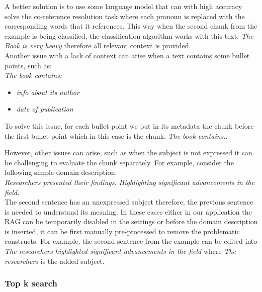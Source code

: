 A better solution is to use some language model that can with high accuracy solve the co-reference resolution task where each pronoun is replaced with the corresponding words that it references. This way when the second chunk from the example is being classified, the classification algorithm works with this text: \textit{The Book is very heavy} therefore all relevant context is provided. \\

Another issue with a lack of context can arise when a text contains some bullet points, such as: \\

\noindent{}\textit{The book contains:}
\begin{itemize}
\item \textit{info about its author}
\item \textit{date of publication} \\
\end{itemize}

\noindent{}To solve this issue, for each bullet point we put in its metadata the chunk before the first bullet point which in this case is the chunk: \textit{The book contains:}.

However, other issues can arise, such as when the subject is not expressed it can be challenging to evaluate the chunk separately. For example, consider the following simple domain description: \\

\noindent{}\textit{Researchers presented their findings. Highlighting significant advancements in the field.} \\

\noindent{}The second sentence has an unexpressed subject therefore, the previous sentence is needed to understand its meaning. In these cases either in our application the RAG can be temporarily disabled in the settings or before the domain description is inserted, it can be first manually pre-processed to remove the problematic constructs. For example, the second sentence from the example can be edited into \textit{The researchers highlighted significant advancements in the field} where \textit{The researchers} is the added subject.


\subsubsection{Top k search}
\label{sec:top_k_search}

